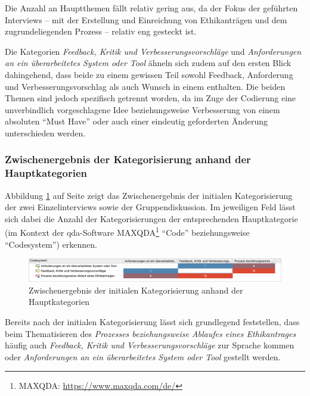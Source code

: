 \documentclass[a4paper,12pt,twoside]{scrreprt}
\begin{document}
Die Anzahl an Hauptthemen fällt relativ gering aus, da der Fokus der geführten Interviews -- mit der Erstellung und Einreichung von Ethikanträgen und dem zugrundeliegenden Prozess -- relativ eng gesteckt ist.

Die Kategorien \textit{Feedback, Kritik und Verbesserungsvorschläge} und \textit{Anforderungen an ein überarbeitetes System oder Tool} ähneln sich zudem auf den ersten Blick dahingehend, dass beide zu einem gewissen Teil sowohl Feedback, Anforderung und Verbesserungsvorschlag als auch Wunsch in einem enthalten. Die beiden Themen sind jedoch spezifisch getrennt worden, da im Zuge der Codierung eine unverbindlich vorgeschlagene Idee beziehungsweise Verbesserung von einem absoluten \enquote{Must Have} oder auch einer eindeutig geforderten Änderung unterschieden werden.

\subsubsection*{Zwischenergebnis der Kategorisierung anhand der Hauptkategorien}
\label{sub-sub-sec:zwischenstand-hauptkategorisisierung}

Abbildung \ref{fig:zwischenstand-hauptkategorisierung} auf Seite \pageref{fig:zwischenstand-hauptkategorisierung} zeigt das Zwischenergebnis der initialen Kategorisierung der zwei Einzelinterviews sowie der Gruppendiskussion. Im jeweiligen Feld lässt sich dabei die Anzahl der Kategorisierungen der entsprechenden Hauptkategorie (im Kontext der \ac{qda}-Software MAXQDA\footnote{MAXQDA: \url{https://www.maxqda.com/de/}} \enquote{Code} beziehungsweise \enquote{Codesystem}) erkennen.

\begin{figure}[ht]
    \centering
    \includegraphics[width=\linewidth]{thesis/images/Luidold_Hauptkategorien-Zwischenergebnis.png}
    \caption{Zwischenergebnis der initialen Kategorisierung anhand der Hauptkategorien}
    \label{fig:zwischenstand-hauptkategorisierung}
\end{figure}

Bereits nach der initialen Kategorisierung lässt sich grundlegend feststellen, dass beim Thematisieren des \textit{Prozesses beziehungsweise Ablaufes eines Ethikantrages} häufig auch \textit{Feedback, Kritik und Verbesserungsvorschläge} zur Sprache kommen oder \textit{Anforderungen an ein überarbeitetes System oder Tool} gestellt werden.
\end{document}
